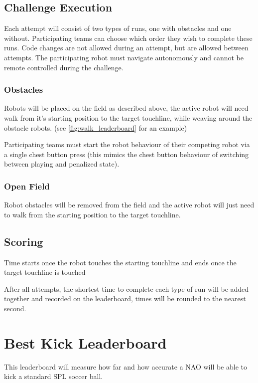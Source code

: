 \subsection{Challenge Execution}
Each attempt will consist of two types of runs, one with obstacles and one without.
Participating teams can choose which order they wish to complete these runs. Code changes are not allowed during an attempt,
but are allowed between attempts. The participating robot must navigate autonomously and cannot be remote controlled during the challenge.

\subsubsection{Obstacles}
Robots will be placed on the field as described above, the active robot will need walk from it's
starting position to the target touchline, while weaving around the obstacle robots. (see \cref{fig:walk_leaderboard} for an example)

Participating teams must start the robot behaviour of their competing robot via a single chest button
press (this mimics the chest button behaviour of switching between playing and penalized state).

\subsubsection{Open Field}
Robot obstacles will be removed from the field and the active robot will just need to walk 
from the starting position to the target touchline.

\subsection{Scoring}
Time starts once the robot touches the starting touchline and ends once the target touchline is touched

After all attempts, the shortest time to complete each type of run will be added together and recorded
on the leaderboard, times will be rounded to the nearest second.

\section{Best Kick Leaderboard}
This leaderboard will measure how far and how accurate a NAO will be able to kick a standard
SPL soccer ball.

